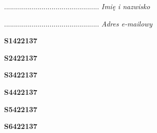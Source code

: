 \begin{turn}{90}\begin{minipage}{\linewidth} \vspace{20mm} ................................................  \textit{Imię i nazwisko}\end{minipage}\end{turn}

\begin{turn}{90}\begin{minipage}{\linewidth} \vspace{20mm} ................................................  \textit{Adres e-mailowy}\end{minipage}\end{turn}

\begin{turn}{90}\huge \begin{minipage}{\linewidth} \vspace{10mm}\textbf{S1422137}\end{minipage}\end{turn}

\begin{turn}{90}\huge \begin{minipage}{\linewidth} \vspace{10mm}\textbf{S2422137}\end{minipage}\end{turn}

\begin{turn}{90}\huge \begin{minipage}{\linewidth} \vspace{10mm}\textbf{S3422137}\end{minipage}\end{turn}

\begin{turn}{90}\huge \begin{minipage}{\linewidth} \vspace{10mm}\textbf{S4422137}\end{minipage}\end{turn}

\begin{turn}{90}\huge \begin{minipage}{\linewidth} \vspace{10mm}\textbf{S5422137}\end{minipage}\end{turn}

\begin{turn}{90}\huge \begin{minipage}{\linewidth} \vspace{10mm}\textbf{S6422137}\end{minipage}\end{turn}

